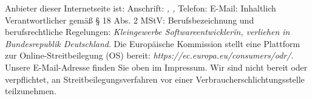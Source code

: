 \documentclass[border=1mm,varwidth]{standalone}
\begin{document}
\color{mytext}
Anbieter dieser Internetseite ist: \textit{}
\newline
Anschrift: \textit{
    ,
    ,
}
\newline
Telefon: \textit{}
\newline
E-Mail: \textit{}
\newline
Inhaltlich Verantwortlicher gemäß § 18 Abs. 2 MStV: \textit{}
\newline
Berufsbezeichnung und berufsrechtliche Regelungen:
\textit{Kleingewerbe Softwareentwicklerïn, verliehen in Bundesrepublik Deutschland}.
\newline
Die Europäische Kommission stellt eine Plattform zur Online-Streitbeilegung (OS) bereit:
\textit{https://ec.europa.eu/consumers/odr/}.
Unsere E-Mail-Adresse finden Sie oben im Impressum.
Wir sind nicht bereit oder verpflichtet, an Streitbeilegungsverfahren vor einer Verbraucherschlichtungsstelle teilzunehmen.
\end{document}

